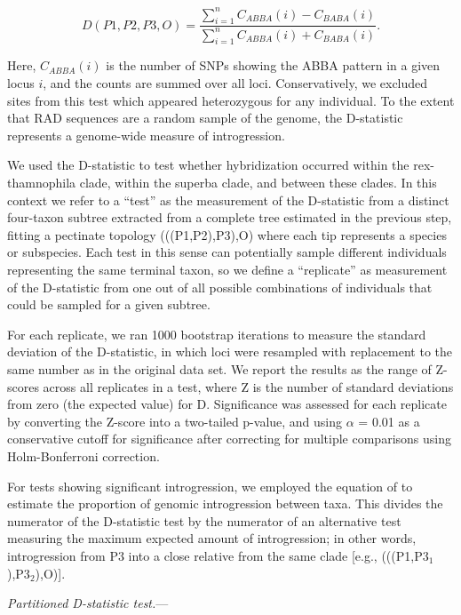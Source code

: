 \documentclass[12pt,letterpaper]{article}
\renewcommand{\subsubsection}[1]{%
\vspace{2ex}
\noindent
\textit{#1.}---}
\begin{document}
\bigskip
\begin{equation}
D(P1,P2,P3,O) = \frac{\sum_{i=1}^{n}C_{ABBA}(i)-C_{BABA}(i)}{\sum_{i=1}^{n}C_{ABBA}(i)+C_{BABA}(i)}. \nonumber
\end{equation}
\bigskip

\noindent Here, $C_{ABBA}(i)$ is the number of SNPs showing the ABBA
pattern in a given locus $i$, and the counts are summed over all loci.
Conservatively, we excluded sites from this test which appeared
heterozygous for any individual. To the extent that RAD sequences are
a random sample of the genome, the D-statistic represents a
genome-wide measure of introgression.

We used the D-statistic to test whether hybridization occurred within
the rex-thamnophila clade, within the superba clade, and between these
clades. In this context we refer to a ``test'' as the measurement of
the D-statistic from a distinct four-taxon subtree extracted from a
complete tree estimated in the previous step, fitting a pectinate
topology (((P1,P2),P3),O) where each tip represents a species or
subspecies. Each test in this sense can potentially sample different
individuals representing the same terminal taxon, so we define a
``replicate'' as measurement of the D-statistic from one out of all
possible combinations of individuals that could be sampled for a given
subtree.

For each replicate, we ran 1000 bootstrap iterations to measure the
standard deviation of the D-statistic, in which loci were resampled
with replacement to the same number as in the original data set. We
report the results as the range of Z-scores across all replicates in a
test, where Z is the number of standard deviations from zero (the
expected value) for D. Significance was assessed for each replicate by
converting the Z-score into a two-tailed p-value, and using $\alpha$ =
0.01 as a conservative cutoff for significance after correcting for
multiple comparisons using Holm-Bonferroni correction.

For tests showing significant introgression, we employed the equation
of \cite{durand_testing_2011} to estimate the proportion of genomic
introgression between taxa. This divides the numerator of the
D-statistic test by the numerator of an alternative test measuring the
maximum expected amount of introgression; in other words,
introgression from P3 into a close relative from the same clade
[e.g., (((P1,P3$_1$),P3$_2$),O)].

\subsubsection{Partitioned D-statistic test}
\end{document}
